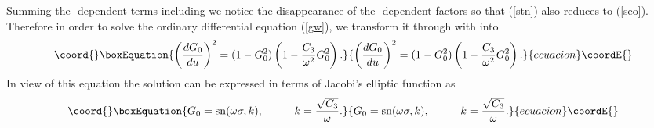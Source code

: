 \documentclass[12pt,a4paper]{article}
\providecommand{\sn}{\mathrm{sn}}
\begin{document}
Summing the \myHighlight{$\tau$}\coordHE{}-dependent terms including \coordHE{} we notice the 
disappearance of the \myHighlight{$\tau$}\coordHE{}-dependent factors so that (\ref{stn}) also 
reduces to (\ref{seo}). Therefore in order 
to solve the ordinary differential equation (\ref{gw}), 
we transform it through \coordHE{} with \coordHE{} into
\begin{equation}\coord{}\boxEquation{
\left(\frac{dG_0}{du}\right)^2 = ( 1 - G_0^2 )\left( 1 - 
\frac{C_3}{\omega^2} G_0^2 \right).
}{
\left(\frac{dG_0}{du}\right)^2 = ( 1 - G_0^2 )\left( 1 - 
\frac{C_3}{\omega^2} G_0^2 \right).
}{ecuacion}\coordE{}\end{equation}
In view of this equation the solution can be expressed in terms of 
Jacobi's elliptic function as 
\begin{equation}\coord{}\boxEquation{
G_0 = \sn(\omega\sigma,k), \hspace{1cm} k = \frac{\sqrt{C_3}}{\omega}.
}{
G_0 = \sn(\omega\sigma,k), \hspace{1cm} k = \frac{\sqrt{C_3}}{\omega}.
}{ecuacion}\coordE{}\end{equation}
\end{document}
